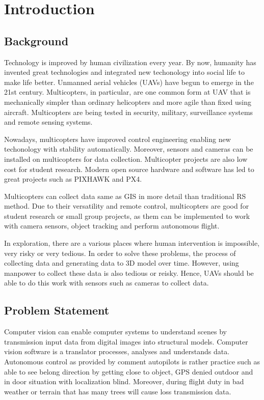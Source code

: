 \documentclass[12pt, a4paper]{aitthesis}
\begin{document}
\pagestyle{plain}

\normalsize


%
\chapter{Introduction} \label{introduction}

\section{Background} 
Technology is improved by human civilization every year. By now, humanity has invented great technologies and integrated new techonology into social life to make life better. Unmanned aerial vehicles (UAVs) have begun to emerge in the 21st century. Multicopters, in particular, are one common form at UAV that is mechanically simpler than ordinary helicopters and more agile than fixed using aircraft. Multicopters are being tested in security, military, surveillance systems and remote sensing systems.

Nowadays, multicopters have improved control engineering enabling new techonology with stability automatically. Moreover, sensors and cameras can be installed on multicopters for data collection. Multicopter projects are also low cost for student research. Modern open source hardware and software has led to great projects such as PIXHAWK and PX4. 

Multicopters can collect data same as GIS in more detail than traditional RS method. Due to their versatility and remote control, multicopters are good for student research or small group projects, as them  can be implemented to work with camera sensors, object tracking and perform autonomous flight. 

In exploration, there are a various places where human intervention is impossible, very risky or very tedious. In order to solve these problems, the process of collecting data and generating data to 3D model over time. However, using manpower to collect these data is also tedious or reisky. Hence, UAVs should be able to do this work with sensors such as cameras to collect data.  



\section{Problem Statement}
Computer vision can enable computer systems to understand scenes by transmission input data from digital images into structural models. Computer vision software is a translator processes, analyses and understands data. Autonomous control as provided by comment autopilots is rather practice such as able to see belong direction by getting close to object, GPS denied outdoor and in door situation with localization blind. Moreover, during flight duty in bad weather or terrain that has many trees will cause loss transmission data.      
\end{document}
